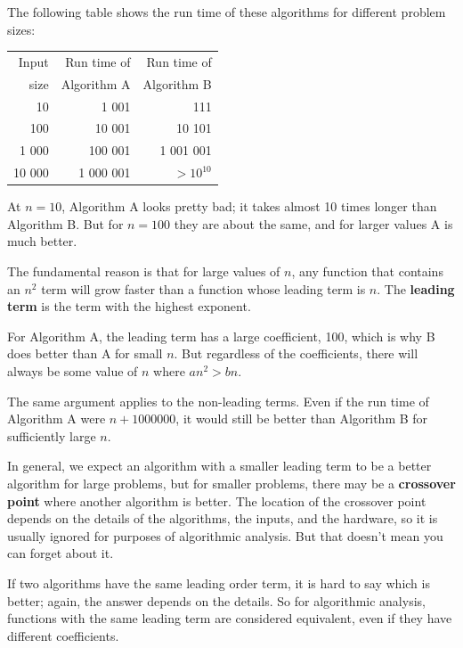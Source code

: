 \documentclass[10pt]{book}
\begin{document}
The following table shows the run time of these algorithms
for different problem sizes:

\begin{tabular}{|r|r|r|}
\hline
Input     &   Run time of     & Run time of \\
size      &   Algorithm A     & Algorithm B \\
\hline
10        &   1 001           & 111         \\
100       &   10 001          & 10 101         \\
1 000     &   100 001         & 1 001 001         \\
10 000    &   1 000 001       & $> 10^{10}$         \\
\hline
\end{tabular}

At $n=10$, Algorithm A looks pretty bad; it takes almost 10 times
longer than Algorithm B.  But for $n=100$ they are about the same, and
for larger values A is much better.

The fundamental reason is that for large values of $n$, any function
that contains an $n^2$ term will grow faster than a function whose
leading term is $n$.  The {\bf leading term} is the term with the
highest exponent.

For Algorithm A, the leading term has a large coefficient, 100, which
is why B does better than A for small $n$.  But regardless of the
coefficients, there will always be some value of $n$ where
$a n^2 > b n$.

The same argument applies to the non-leading terms.  Even if the run
time of Algorithm A were $n+1000000$, it would still be better than
Algorithm B for sufficiently large $n$.

In general, we expect an algorithm with a smaller leading term to be a
better algorithm for large problems, but for smaller problems, there
may be a {\bf crossover point} where another algorithm is better.  The
location of the crossover point depends on the details of the
algorithms, the inputs, and the hardware, so it is usually ignored for
purposes of algorithmic analysis.  But that doesn't mean you can forget
about it.

If two algorithms have the same leading order term, it is hard to say
which is better; again, the answer depends on the details.  So for
algorithmic analysis, functions with the same leading term
are considered equivalent, even if they have different coefficients.
\end{document}
